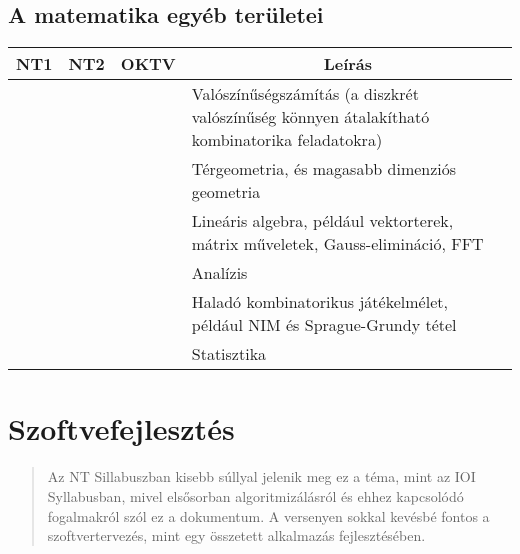 \documentclass[a4paper,11pt,oneside]{article}
\newcommand{\xmark}{\ding{55}}%
\newcommand{\cnfoc}{{\small\faQuestion}}
\newcommand{\cexcl}{{\small\xmark}}
\newcommand{\ctable}[1]{
    \begin{center}
        \begin{longtable}{ | C | C | C | m{8cm} | } %
        \hline
        \textbf{NT1} & \textbf{NT2} & \textbf{OKTV} & \multicolumn{1}{|c|}{\textbf{Leírás}} \\ \hline
        \endhead
        #1
        \end{longtable}
    \end{center}
}
\begin{document}
\subsection {A matematika egyéb területei} %
\label{subsubsec:other-mathematics}

\ctable {
    \cnfoc & \cnfoc & \cnfoc & Valószínűségszámítás (a diszkrét valószínűség könnyen
    átalakítható kombinatorika feladatokra)
    \\ \hline  %
    \cexcl & \cexcl & \cexcl & Térgeometria, és magasabb dimenziós geometria
    \\ \hline  %
    \cexcl & \cexcl & \cexcl & Lineáris algebra, például vektorterek, mátrix műveletek,
    Gauss-elimináció, FFT
    \\ \hline  %
    \cexcl & \cexcl & \cexcl & Analízis
    \\ \hline  %
    \cexcl & \cexcl & \cexcl & Haladó kombinatorikus játékelmélet, például NIM és Sprague-Grundy tétel
    \\ \hline  %
    \cexcl & \cexcl & \cexcl & Statisztika
    \\ \hline  %

}

\section {Szoftvefejlesztés} %
\label{subsec:software-engineering}

\begin{quote}
    Az NT Sillabuszban kisebb súllyal jelenik meg ez a téma, mint az IOI Syllabusban, mivel
    elsősorban algoritmizálásról és ehhez kapcsolódó fogalmakról szól ez a dokumentum. A versenyen
    sokkal kevésbé fontos a szoftvertervezés, mint egy összetett alkalmazás fejlesztésében.
\end{quote}
\end{document}
